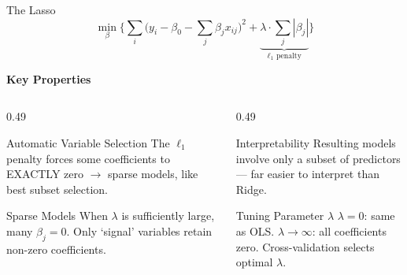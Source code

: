 \documentclass[ignorenonframetext,]{beamer}
\begin{document}
\begin{frame}{The Lasso}
{\small$$\min_{\beta}\bigg\{\sum_i \Big(y_i - \beta_0 - \sum_j \beta_j x_{ij}\Big)^2 + \underbrace{\lambda\cdot\sum_j |\beta_j|}_{\ell_1 \text{ penalty}}\bigg\}$$}

\vspace{-6pt}
\textbf{Key Properties}
\vspace{-6pt}
\begin{columns}[T]
\begin{column}{0.49\textwidth}
\scriptsize
\begin{exampleblock}{Automatic Variable Selection}
The $\ell_1$ penalty forces some coefficients to EXACTLY zero $\rightarrow$ sparse models, like best subset selection.
\end{exampleblock}
\begin{block}{Sparse Models}
When $\lambda$ is sufficiently large, many $\beta_j = 0$. Only `signal' variables retain non-zero coefficients.
\end{block}
\end{column}
\begin{column}{0.49\textwidth}
\scriptsize
\begin{block}{Interpretability}
Resulting models involve only a subset of predictors --- far easier to interpret than Ridge.
\end{block}
\begin{block}{Tuning Parameter $\lambda$}
$\lambda = 0$: same as OLS. $\lambda \rightarrow \infty$: all coefficients zero. Cross-validation selects optimal $\lambda$.
\end{block}
\end{column}
\end{columns}
\end{frame}
\end{document}

